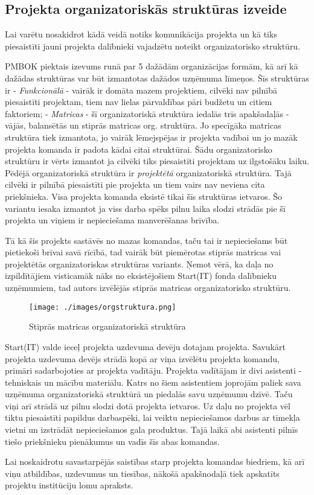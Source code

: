 \subsection{Projekta organizatoriskās struktūras izveide}
Lai varētu nosakidrot kādā veidā notiks komunikācija projekta un kā tiks 
piesaistīti jauni projekta dalībnieki vajadzētu noteikt organizatorisko struktūru.
\par
PMBOK piektais izevums runā par 5 dažādām organizācijas formām, kā arī kā dažādas struktūras var būt 
izmantotas dažādos uzņēmuma līmeņos.
Šīs struktūras ir - \textit{Funkcionālā} - vairāk ir domāta mazem projektiem, cilvēki nav pilnībā
piesaistīti projektam, tiem nav lielas pārvaldības pāri budžetu un citiem faktoriem; - \textit{Matricas} - 
šī organizatoriskā struktūra iedalās trīs apakšadaļās - vājās, balansētās un stiprās matricas org. struktūra.
Jo specīgāka matricas struktūra tiek izmantota, jo vairāk lēmejspējas ir projekta vadībai un jo mazāk projekta
komanda ir padota kādai citai struktūrai. Šādu organizatorisko struktūru ir vērts izmantot ja cilvēki tiks
piesaistīti projektam uz ilgstošāku laiku. Pēdējā organizatoriskā struktūra ir \textit{projektētā} organizatoriskā
struktūra. Tajā cilvēki ir pilnībā piesaistīti pie projekta un tiem vairs nav neviena cita priekšnieka. Visa 
projekta komanda eksistē tikai šīs struktūras ietvaros. Šo variantu iesaka izmantot ja viss darba spēks pilnu
laika slodzi strādās pie šī projekta un viņiem ir nepieciešama manverēšanas brīvība. \cite{PMBOK}
\par
Tā kā šis projekts sastāvēs no mazas komandas, taču tai ir nepieciešams būt pietiekoši brīvai savā rīcībā, tad
vairāk būt piemērotas stiprās matricas vai projektētās organizatoriskas struktūras variants. Ņemot vērā, ka daļa
no izpildītājiem visticamāk nāks no eksistējošiem Start(IT) fonda dalībnieku uzņēmumiem, tad autors izvēlējās
stiprās matricas organizatorisko struktūru.
\par
\begin{figure}[h!]
  \centering
  \texttt{[image: ./images/orgstruktura.png]}
  \label{image:riski}
  \caption{Stiprās matricas organizatoriskā struktūra}
\end{figure}
\par
Start(IT) valde ieceļ projekta uzdevuma devēju dotajam projekta. Savukārt projekta uzdevuma devējs strādā
kopā ar viņa izvēlētu projekta komandu, primāri sadarbojoties ar projekta vadītāju. Projekta vadītājam ir
divi asistenti - tehniskais un mācību materiālu. Katrs no šiem asistentiem joprojām paliek sava uzņēmuma
organizatoriskā struktūrā un piedalās savu uzņēmumu dzīvē. Taču viņi arī strādā uz pilnu slodzi dotā
projekta ietvaros. Uz daļu no projekta vēl tiktu piesaistīti papildus darbaspēki, lai veiktu nepieciešamos
darbus ar tīmekļa vietni un izstrādāt nepieciešamos gala produktus. Tajā laikā abi asistenti pilnīs tiešo
priekšnieku pienākumus un vadīs šīs abas komandas.
\par
Lai noskaidrotu savastarpējās saistības starp projekta komandas biedriem, kā arī viņu atbildības, uzdevumus
un tiesības, nākošā apakšnodaļā tiek apskatīts projektu institūciju lomu apraksts.  

